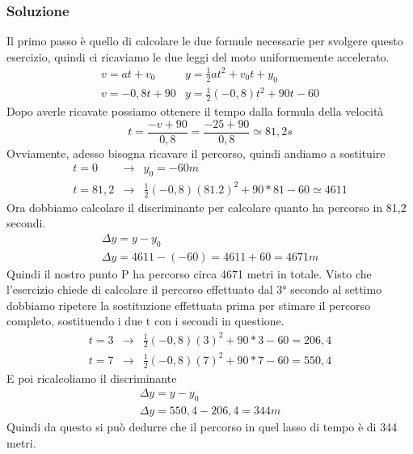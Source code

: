 \documentclass{book}
\begin{document}
\subsubsection{Soluzione}
Il primo passo è quello di calcolare le due formule necessarie per svolgere
questo esercizio, quindi ci ricaviamo le due leggi del moto uniformemente
accelerato.
\begin{equation*}
	\begin{matrix}
		v=at+v_0&y=\frac{1}{2}at^2+v_0t+y_0\\
		v=-0,8t+90&y=\frac{1}{2}\left(-0,8\right)t^2+90t-60
	\end{matrix}
\end{equation*}
Dopo averle ricavate possiamo ottenere il tempo dalla formula della velocità
\begin{equation*}
	t=\frac{-v+90}{0,8}=\frac{-25+90}{0,8}\simeq81,2s
\end{equation*}
Ovviamente, adesso bisogna ricavare il percorso, quindi andiamo a sostituire
\begin{equation*}
	\begin{matrix}
		t=0&\to&y_0=-60m\\
		t=81,2&\to&\frac{1}{2}\left(-0,8\right)(81.2)^2+90*81-60\simeq 4611
	\end{matrix}
\end{equation*}
Ora dobbiamo calcolare il discriminante per calcolare quanto ha percorso in
81,2 secondi.
\begin{equation*}
	\begin{matrix}
		\Delta y=y-y_0\\
		\Delta y=4611-(-60)=4611+60=4671m
	\end{matrix}
\end{equation*}
Quindi il nostro punto P ha percorso circa 4671 metri in totale.
Visto che l'esercizio chiede di calcolare il percorso effettuato dal 3° secondo
al settimo dobbiamo ripetere la sostituzione effettuata prima per stimare il
percorso completo, sostituendo i due t con i secondi in questione.
\begin{equation*}
	\begin{matrix}
		t=3&\to&\frac{1}{2}\left(-0,8\right)(3)^2+90*3-60=206,4\\
		t=7&\to&\frac{1}{2}\left(-0,8\right)(7)^2+90*7-60=550,4
	\end{matrix}
\end{equation*}
E poi ricalcoliamo il discriminante
\begin{equation*}
	\begin{matrix}
		\Delta y=y-y_0\\
		\Delta y=550,4-206,4=344m
	\end{matrix}
\end{equation*}
Quindi da questo si può dedurre che il percorso in quel lasso di tempo è di 344
metri.
\end{document}
